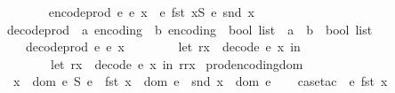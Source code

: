 \begin{isabellebody}
\ \ \ \isanewline
\ \ \ \ {\isachardoublequoteopen}encode{\isacharunderscore}{\kern0pt}prod\ e{}\ e{}\ x\ {\isacharequal}{\kern0pt}\ e{}\ {\isacharparenleft}{\kern0pt}fst\ x{\isacharparenright}{\kern0pt}{\isacharat}{\kern0pt}\isactrlsub S\ e{}\ {\isacharparenleft}{\kern0pt}snd\ x{\isacharparenright}{\kern0pt}{\isachardoublequoteclose}\isanewline
\isanewline
{}\isamarkupfalse%
\ decode{\isacharunderscore}{\kern0pt}prod\ {\isacharcolon}{\kern0pt}{\isacharcolon}{\kern0pt}\ {\isachardoublequoteopen}{\isacharprime}{\kern0pt}a\ encoding\ {\isasymRightarrow}\ {\isacharprime}{\kern0pt}b\ encoding\ {\isasymRightarrow}\ bool\ list\ {\isasymRightarrow}\ {\isacharparenleft}{\kern0pt}{\isacharprime}{\kern0pt}a\ {\isasymtimes}\ {\isacharprime}{\kern0pt}b{\isacharparenright}{\kern0pt}\ {\isasymtimes}\ bool\ list{\isachardoublequoteclose}\isanewline
\ \ \isanewline
\ \ \ \ {\isachardoublequoteopen}decode{\isacharunderscore}{\kern0pt}prod\ e{}\ e{}\ x{}\ {\isacharequal}{\kern0pt}\ {\isacharparenleft}{\kern0pt}\isanewline
\ \ \ \ \ \ let\ {\isacharparenleft}{\kern0pt}r{}{\isacharcomma}{\kern0pt}x{}{\isacharparenright}{\kern0pt}\ {\isacharequal}{\kern0pt}\ decode\ e{}\ x{}\ in\ {\isacharparenleft}{\kern0pt}\isanewline
\ \ \ \ \ \ \ \ let\ {\isacharparenleft}{\kern0pt}r{}{\isacharcomma}{\kern0pt}x{}{\isacharparenright}{\kern0pt}\ {\isacharequal}{\kern0pt}\ decode\ e{}\ x{}\ in\ {\isacharparenleft}{\kern0pt}{\isacharparenleft}{\kern0pt}r{}{\isacharcomma}{\kern0pt}r{}{\isacharparenright}{\kern0pt}{\isacharcomma}{\kern0pt}x{}{\isacharparenright}{\kern0pt}{\isacharparenright}{\kern0pt}{\isacharparenright}{\kern0pt}{\isachardoublequoteclose}\isanewline
\isanewline
{}\isamarkupfalse%
\ prod{\isacharunderscore}{\kern0pt}encoding{\isacharunderscore}{\kern0pt}dom{\isacharcolon}{\kern0pt}\isanewline
\ \ {\isachardoublequoteopen}x\ {\isasymin}\ dom\ {\isacharparenleft}{\kern0pt}e{}\ {\isasymtimes}\isactrlsub S\ e{}{\isacharparenright}{\kern0pt}\ {\isacharequal}{\kern0pt}\ {\isacharparenleft}{\kern0pt}fst\ x\ {\isasymin}\ dom\ e{}\ {\isasymand}\ snd\ x\ {\isasymin}\ dom\ e{}{\isacharparenright}{\kern0pt}{\isachardoublequoteclose}\isanewline
%
\isadelimproof
\ \ %
\endisadelimproof
%
\isatagproof
{}\isamarkupfalse%
\ {\isacharparenleft}{\kern0pt}case{\isacharunderscore}{\kern0pt}tac\ {\isacharbrackleft}{\kern0pt}{\isacharbang}{\kern0pt}{\isacharbrackright}{\kern0pt}\ {\isachardoublequoteopen}e{}\ {\isacharparenleft}{\kern0pt}fst\ x{\isacharparenright}{\kern0pt}{\isachardoublequoteclose}{\isacharparenright}{\kern0pt}\isanewline

\end{isabellebody}
